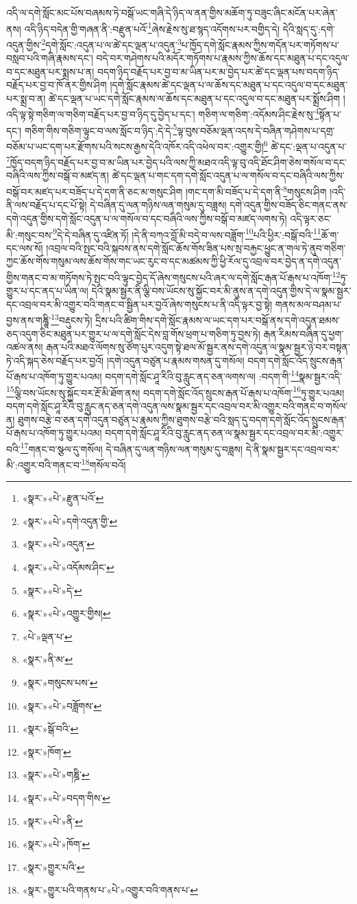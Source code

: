 འདི་ལ་དགེ་སློང་མང་པོས་བཞམས་ཏེ་བསྒོ་ཡང་གཞི་དེ་ཉིད་ལ་ནན་གྱིས་མཆོག་ཏུ་བཟུང་ཞིང་མངོན་པར་ཞེན་ནས། འདི་ཉིད་བདེན་གྱི་གཞན་ནི་:བརྫུན་པའོ་\footnote{«སྣར་»«པེ་»རྫུན་པའོ་}ཞེས་རྗེས་སུ་ཐ་སྙད་འདོགས་པར་བགྱིད་དེ། དེའི་སླད་དུ་:དགེ་འདུན་གྱིས་\footnote{«སྣར་»«པེ་»དགེ་འདུན་གྱི་}དགེ་སློང་:འདུན་པ་ལ་ཚེ་དང་ལྡན་པ་འདུན་\footnote{«སྣར་»«པེ་»འདུན་}པ་ཁྱོད་དགེ་སློང་རྣམས་ཀྱིས་གདོན་པར་གཏོགས་པ་བསླབ་པའི་གཞི་རྣམས་དང་། བདེ་བར་གཤེགས་པའི་མདོར་གཏོགས་པ་རྣམས་ཀྱིས་ཆོས་དང་མཐུན་པ་དང་འདུལ་བ་དང་མཐུན་པར་སྨྲས་པ་ན། བདག་ཉིད་བརྗོད་པར་བྱ་བ་མ་ཡིན་པར་མ་བྱེད་པར་ཚེ་དང་ལྡན་པས་བདག་ཉིད་བརྗོད་པར་བྱ་བ་ཁོ་ནར་གྱིས་ཤིག །དགེ་སློང་རྣམས་ཚེ་དང་ལྡན་པ་ལ་ཆོས་དང་མཐུན་པ་དང་འདུལ་བ་དང་མཐུན་པར་སྨྲ་བ་ན། ཚེ་དང་ལྡན་པ་ཡང་དགེ་སློང་རྣམས་ལ་ཆོས་དང་མཐུན་པ་དང་འདུལ་བ་དང་མཐུན་པར་སྨྲོས་ཤིག །འདི་ལྟ་སྟེ་གཅིག་ལ་གཅིག་བརྗོད་པར་བྱ་བ་ཉིད་དུ་བྱེད་པ་དང་། གཅིག་ལ་གཅིག་:འདོམས་ཤིང་རྗེས་སུ་\footnote{«སྣར་»«པེ་»འདོམས་ཤིང་}སྟོན་པ་དང་། གཅིག་གིས་གཅིག་ལྟུང་བ་ལས་སློང་བ་ཉིད་:དེ་དེ་\footnote{«སྣར་»«པེ་»དེ་}ལྟ་བུས་བཅོམ་ལྡན་འདས་དེ་བཞིན་གཤེགས་པ་དགྲ་བཅོམ་པ་ཡང་དག་པར་རྫོགས་པའི་སངས་རྒྱས་དེའི་འཁོར་འདི་འཕེལ་བར་:འགྱུར་གྱི།\footnote{«སྣར་»«པེ་»འགྱུར་གྱིས།} ཚེ་དང་:ལྡན་པ་འདུན་པ་\footnote{«པེ་»ལྡན་པ་}ཁྱོད་བདག་ཉིད་བརྗོད་པར་བྱ་བ་མ་ཡིན་པར་བྱེད་པའི་ལས་ཀྱི་མཐའ་འདི་ལྟ་བུ་འདི་ཐོང་ཤིག་ཅེས་གསོལ་བ་དང་བཞིའི་ལས་ཀྱིས་བསྒོ་བ་མཛད་ན། ཚེ་དང་ལྡན་པ་གང་དག་དགེ་སློང་འདུན་པ་ལ་གསོལ་བ་དང་བཞིའི་ལས་ཀྱིས་བསྒོ་བར་མཛད་པར་བཟོད་པ་དེ་དག་ནི་ཅང་མ་གསུང་ཤིག །གང་དག་མི་བཟོད་པ་དེ་དག་ནི་\footnote{«སྣར་»ནི་མ་}གསུངས་ཤིག །འདི་ནི་ལས་བརྗོད་པ་དང་པོ་སྟེ། དེ་བཞིན་དུ་ལན་གཉིས་ལན་གསུམ་དུ་བཟླས། དགེ་འདུན་གྱིས་བཟོད་ཅིང་གནང་ནས་དགེ་འདུན་གྱིས་དགེ་སློང་འདུན་པ་ལ་གསོལ་བ་དང་བཞིའི་ལས་ཀྱིས་བསྒོ་བ་མཛད་ལགས་ཏེ། འདི་ལྟར་ཅང་མི་:གསུང་བས་\footnote{«སྣར་»གསུངས་པས་}དེ་དེ་བཞིན་དུ་འཛིན་ཏོ། །དེ་ནི་བཀའ་བློ་མི་བདེ་བ་ལས་བཟློག་\footnote{«སྣར་»«པེ་»བཟློགས་}པའི་ཕྱིར་:བསྒོ་བའི་\footnote{«སྣར་»སྒོ་བའི་}ཆོ་ག་དང་ལས་སོ། །འབྲལ་བའི་སྤང་བའི་སྐབས་ནས་དགེ་སློང་ཆོས་གོས་ཟིན་པས་སྲ་བརྐྱང་ཕྱུང་ན་གལ་ཏེ་ནུབ་གཅིག་ཀྱང་ཆོས་གོས་གསུམ་ལས་ཆོས་གོས་གང་ཡང་རུང་བ་དང་མཚམས་ཀྱི་ཕྱི་རོལ་དུ་འབྲལ་བར་བྱེད་ན་དགེ་འདུན་གྱིས་གནང་བ་མ་གཏོགས་ཏེ་སྤང་བའི་ལྟུང་བྱེད་དོ་ཞེས་གསུངས་པའི་ཞར་ལ་དགེ་སློང་རྒན་པོ་རྒས་པ་འཁོག་\footnote{«སྣར་»ཁོག་}ཏུ་གྱུར་པ་དང་ནད་པ་ཡིན་ལ། དེའི་སྣམ་སྦྱར་ནི་ལྕི་བས་ཡོངས་སུ་སྐྱོང་བར་མི་ནུས་ན་དགེ་འདུན་གྱིས་དེ་ལ་སྣམ་སྦྱར་དང་འབྲལ་བར་མི་འགྱུར་བའི་གནང་བ་སྦྱིན་པར་བྱའོ་ཞེས་གསུངས་པ་ནི་འདི་ལྟར་བྱ་སྟེ། གནས་མལ་བཤམ་པ་བྱས་ནས་གཎྜཱི་\footnote{«སྣར་»«པེ་»གཎྜི་}བརྡུངས་ཏེ། དྲིས་པའི་ཚིག་གིས་དགེ་སློང་རྣམས་ལ་ཡང་དག་པར་བསྒོ་ནས་དགེ་འདུན་ཐམས་ཅད་འདུག་ཅིང་མཐུན་པར་གྱུར་པ་ལ་དགེ་སློང་དེས་བླ་གོས་ཕྲག་པ་གཅིག་ཏུ་བྱས་ཏེ། རྒན་རིམས་བཞིན་དུ་ཕྱག་འཚལ་ནས། རྒན་པའི་མཐའ་ལོགས་སུ་ཙོག་པུར་འདུག་སྟེ་ཐལ་མོ་སྦྱར་ནས་དགེ་འདུན་ལ་སྣམ་སྦྱར་ཉེ་བར་བསྟན་ཏེ་འདི་སྐད་ཅེས་བརྗོད་པར་བྱའོ། །དགེ་འདུན་བཙུན་པ་རྣམས་གསན་དུ་གསོལ། བདག་དགེ་སློང་འོད་སྲུངས་རྒན་པོ་རྒས་པ་འཁོག་ཏུ་གྱུར་པའམ། བདག་དགེ་སློང་ཤཱ་རིའི་བུ་རླུང་ནད་ཅན་ལགས་ལ། :བདག་གི་\footnote{«སྣར་»«པེ་»བདག་གིས་}སྣམ་སྦྱར་འདི་\footnote{«སྣར་»«པེ་»ནི་}ལྕི་བས་ཡོངས་སུ་སྐྱོང་བར་རྔོ་མི་ཐོག་ནས། བདག་དགེ་སློང་འོད་སྲུངས་རྒན་པོ་རྒས་པ་འཁོག་\footnote{«སྣར་»«པེ་»ཁོག་}ཏུ་གྱུར་པའམ། བདག་དགེ་སློང་ཤཱ་རིའི་བུ་རླུང་ནད་ཅན་དགེ་འདུན་ལས་སྣམ་སྦྱར་དང་འབྲལ་བར་མི་འགྱུར་བའི་གནང་བ་གསོལ་ན། ཐུགས་བརྩེ་བ་ཅན་དགེ་འདུན་བཙུན་པ་རྣམས་ཀྱིས་ཐུགས་བརྩེ་བའི་སླད་དུ་བདག་དགེ་སློང་འོད་སྲུངས་རྒན་པོ་རྒས་པ་འཁོག་ཏུ་གྱུར་པའམ། བདག་དགེ་སློང་ཤཱ་རིའི་བུ་རླུང་ནད་ཅན་ལ་སྣམ་སྦྱར་དང་འབྲལ་བར་མི་:འགྱུར་བའི་\footnote{«སྣར་»གྱུར་པའི་}གནང་བ་སྩལ་དུ་གསོལ། དེ་བཞིན་དུ་ལན་གཉིས་ལན་གསུམ་དུ་བཟླས། དེ་ནི་སྣམ་སྦྱར་དང་འབྲལ་བར་མི་:འགྱུར་བའི་གནང་བ་\footnote{«སྣར་»གྱུར་པའི་གནས་པ་«པེ་»འགྱུར་བའི་གནས་པ་}གསོལ་བའོ། 